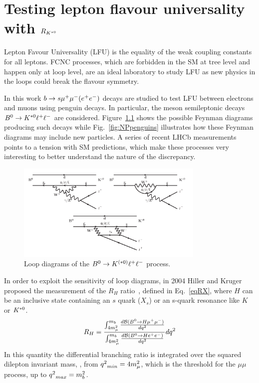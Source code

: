 \chapter{Testing lepton flavour universality with $R_{{{K}^{*0}}}$}
\label{sec:RKst_theory}

Lepton Favour Universality (LFU) is the equality of the weak coupling constants for all leptons.
FCNC processes, which are forbidden in the SM at tree level and happen only at loop level,
are an ideal laboratory to study LFU as new physics in the loops could break the flavour symmetry.
 
In this work $b \rightarrow s{\mu^+\mu^-} (e^+ e^-)$ decays are studied to test LFU between electrons and muons
using penguin decays. In particular, the \Bz meson semileptonic decays ${{B}^0}\rightarrow{\ensuremath{{K}^{*0}}}\ell^+ \ell^-$ are considered.
Figure~\ref{fig:RKpenguins} shows the possible Feynman diagrams  producing such decays while 
Fig.~\ref{fig:NPpenguins} illustrates how these Feynman diagrams may include new particles. 
A series of recent LHCb measurements~\cite{TomRDreview} points to a tension with SM predictions, which make
these processes very interesting to better understand the nature of the discrepancy.
%
\begin{figure}[h]
\centering \includegraphics[width=0.8\textwidth]{RKst/figs/penguins3.png}
\caption{Loop diagrams of the ${{B}^0} \rightarrow K^{(*0)}\ell^+ \ell^-$ process.}
\label{fig:RKpenguins}
\end{figure}

In order to exploit the sensitivity of loop diagrams, in 2004 Hiller and Kruger proposed the measurement 
of the $R_H$ ratio~\cite{Hiller:2003js}, defined in Eq.~\ref{eqRX}, where $H$ can be an inclusive state containing 
an $s$ quark ($X_s$) or an s-quark resonance like $K$ or ${{K}^{*0}}$.
\begin{equation}
\label{eqRX}
R_{H} = \frac{\int_{4m_{\mu}^2}^{m_b} \frac{ d{\cal B}({{B}^0} \rightarrow H {\mu^+\mu^-}) }{d{q^2}}}{ \int_{4m_{\mu}^2}^{m_b}\frac{ d{\cal B}({{B}^0} \rightarrow H{e^+e^-}) }{d{q^2}}} d{q^2}
\end{equation}
In this quantity the differential branching ratio is integrated over the squared dilepton invariant mass, \qsq, from 
${q^2}_{min} = 4m_{\mu}^2$, which is the threshold for the $\mu\mu$ process, up to \mbox{${q^2}_{max} = m_b^2$.} 

